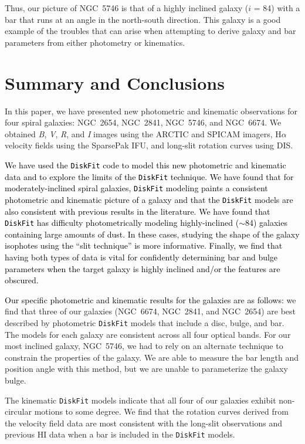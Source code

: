 \documentclass[a4paper,fleqn,usenatbib]{mnras}
\newcommand{\authorfix}{\textcolor{black}}
\begin{document}
Thus, our picture of NGC~5746 is that of a highly inclined galaxy ($\textit{i}$ = 84\degr) with a bar that runs at an angle in the north-south direction. This galaxy is a good example of the troubles that can arise when attempting to derive galaxy and bar parameters from either photometry or kinematics.

\section{Summary and Conclusions}
\label{sec:summary}

In this paper, we have presented new photometric and kinematic observations for four spiral galaxies: NGC~2654, NGC~2841, NGC~5746, and NGC~6674. We obtained \textit{B}, \textit{V}, \textit{R}, and \textit{I}  images using the ARCTIC and SPICAM imagers, H$\alpha$ velocity fields using the SparsePak IFU, and long-slit rotation curves using DIS. 

\authorfix{We have used the \texttt{DiskFit} code to model this new photometric and kinematic data and to explore the limits of the \texttt{DiskFit} technique. We have found that for moderately-inclined spiral galaxies, \texttt{DiskFit} modeling paints a consistent photometric and kinematic picture of a galaxy and that the \texttt{DiskFit} models are also consistent with previous results in the literature. We have found that \texttt{DiskFit} has difficulty photometrically modeling highly-inclined ($\sim$84\degr) galaxies containing large amounts of dust. In these cases, studying the shape of the galaxy isophotes using the ``slit technique'' is more informative. Finally, we find that having both types of data is vital for confidently determining bar and bulge parameters when the target galaxy is highly inclined and/or the features are obscured.} 

\authorfix{Our specific photometric and kinematic results for the galaxies are as follows:} we find that three of our galaxies (NGC~6674, NGC~2841, and NGC~2654) are best described by photometric \texttt{DiskFit} models that include a disc, bulge, and bar. The models for each galaxy are consistent across all four optical bands. For our most inclined galaxy, NGC~5746, we had to rely on an alternate technique to constrain the properties of the galaxy.  We are able to measure the bar length and position angle with this method, but we are unable to parameterize the galaxy bulge.

The kinematic \texttt{DiskFit} models indicate that all four of our galaxies  exhibit non-circular motions to some degree. We find that the rotation curves derived from the velocity field data are most consistent with the long-slit observations and previous HI data when a bar is included in the \texttt{DiskFit} models.
\end{document}
